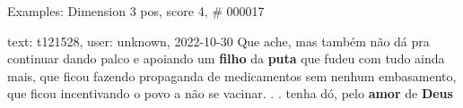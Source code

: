 \begin{frame}{Examples: Dimension 3 pos, score 4, \# 000017}
\footnotesize
\begin{exampleblock}{text: t121528, user: unknown, 2022-10-30}
Que ache, mas também não dá pra continuar dando palco e apoiando um 
\textbf{filho} da \textbf{puta} que fudeu com tudo ainda mais, que ficou 
fazendo propaganda de medicamentos sem nenhum embasamento, que ficou 
incentivando o povo a não se vacinar. . . tenha dó, pelo \textbf{amor} de 
\textbf{Deus} 
\end{exampleblock}
\end{frame}
